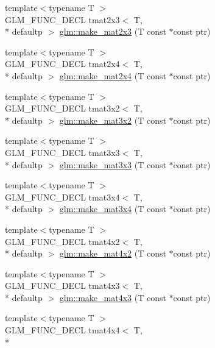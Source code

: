 \begin{DoxyCompactItemize}
{\footnotesize template$<$typename T $>$ }\\G\-L\-M\-\_\-\-F\-U\-N\-C\-\_\-\-D\-E\-C\-L tmat2x3$<$ T, \\*
defaultp $>$ \hyperlink{group__gtc__type__ptr_ga37988c6dd941f617cdfab86d54375fc1}{glm\-::make\-\_\-mat2x3} (T const $\ast$const ptr)
\item 
{\footnotesize template$<$typename T $>$ }\\G\-L\-M\-\_\-\-F\-U\-N\-C\-\_\-\-D\-E\-C\-L tmat2x4$<$ T, \\*
defaultp $>$ \hyperlink{group__gtc__type__ptr_ga6dfb2ac10859b0cc8e3893ea84fa95b5}{glm\-::make\-\_\-mat2x4} (T const $\ast$const ptr)
\item 
{\footnotesize template$<$typename T $>$ }\\G\-L\-M\-\_\-\-F\-U\-N\-C\-\_\-\-D\-E\-C\-L tmat3x2$<$ T, \\*
defaultp $>$ \hyperlink{group__gtc__type__ptr_gabe1e5066608a66da7a94f802b57b4eed}{glm\-::make\-\_\-mat3x2} (T const $\ast$const ptr)
\item 
{\footnotesize template$<$typename T $>$ }\\G\-L\-M\-\_\-\-F\-U\-N\-C\-\_\-\-D\-E\-C\-L tmat3x3$<$ T, \\*
defaultp $>$ \hyperlink{group__gtc__type__ptr_ga3cbe7adf857c867cee77eae4617abadd}{glm\-::make\-\_\-mat3x3} (T const $\ast$const ptr)
\item 
{\footnotesize template$<$typename T $>$ }\\G\-L\-M\-\_\-\-F\-U\-N\-C\-\_\-\-D\-E\-C\-L tmat3x4$<$ T, \\*
defaultp $>$ \hyperlink{group__gtc__type__ptr_gac083edd180ab4d4b817acc60c516209b}{glm\-::make\-\_\-mat3x4} (T const $\ast$const ptr)
\item 
{\footnotesize template$<$typename T $>$ }\\G\-L\-M\-\_\-\-F\-U\-N\-C\-\_\-\-D\-E\-C\-L tmat4x2$<$ T, \\*
defaultp $>$ \hyperlink{group__gtc__type__ptr_ga967a5b934e67ff9a6d1d0d27a377a264}{glm\-::make\-\_\-mat4x2} (T const $\ast$const ptr)
\item 
{\footnotesize template$<$typename T $>$ }\\G\-L\-M\-\_\-\-F\-U\-N\-C\-\_\-\-D\-E\-C\-L tmat4x3$<$ T, \\*
defaultp $>$ \hyperlink{group__gtc__type__ptr_ga4d42daced532b33cc672280e48670a51}{glm\-::make\-\_\-mat4x3} (T const $\ast$const ptr)
\item 
{\footnotesize template$<$typename T $>$ }\\G\-L\-M\-\_\-\-F\-U\-N\-C\-\_\-\-D\-E\-C\-L tmat4x4$<$ T, \\*

\end{DoxyCompactItemize}
